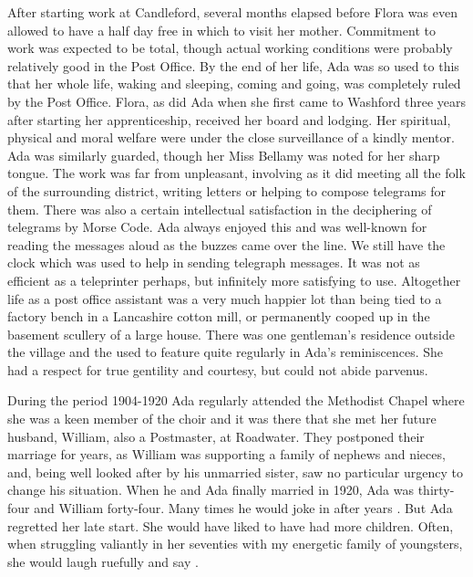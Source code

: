 After starting work at Candleford, several months elapsed before Flora was even allowed to have a half day free in which to visit her mother. Commitment to work was expected to be total, though actual working conditions were probably relatively good in the Post Office. By the end of her life, Ada was so used to this that her whole life, waking and sleeping, coming and going, was completely ruled by the Post Office. Flora, as did Ada when she first came to Washford three years after starting her apprenticeship, received her board and lodging. Her spiritual, physical and moral welfare were under the close surveillance of a kindly mentor. Ada was similarly guarded, though her Miss Bellamy was noted for her sharp tongue. The work was far from unpleasant, involving as it did meeting all the folk of the surrounding district, writing letters or helping to compose telegrams for them. There was also a certain intellectual satisfaction in the deciphering of telegrams by Morse Code. Ada always enjoyed this and was well-known for reading the messages aloud as the buzzes came over the line. We still have the clock which was used to help in sending telegraph messages. It was not as efficient as a teleprinter perhaps, but infinitely more satisfying to use. Altogether life as a post office assistant was a very much happier lot than being tied to a factory bench in a Lancashire cotton mill, or permanently cooped up in the basement scullery of a large house. There was one gentleman's residence outside the village and the  used to feature quite regularly in Ada's reminiscences. She had a respect for true gentility and courtesy, but could not abide  parvenus.

During the period 1904-1920 Ada regularly attended the Methodist Chapel where she was a keen member of the choir and it was there that she met her future husband, William, also a Postmaster, at Roadwater. They postponed their marriage for years, as William was supporting a family of nephews and nieces, and, being well looked after by his unmarried sister, saw no particular urgency to change his situation. When he and Ada finally married in 1920, Ada was thirty-four and William forty-four. Many times he would joke in after years . But Ada regretted her late start. She would have liked to have had more children. Often, when struggling valiantly in her seventies with my energetic family of youngsters, she would laugh ruefully and say .

